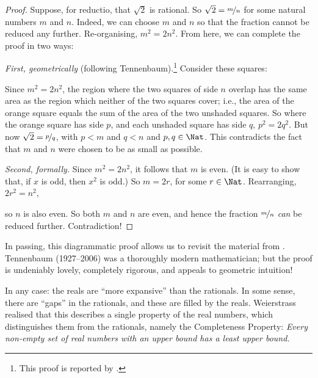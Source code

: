 \begin{proof}
Suppose, for reductio, that $\sqrt{2}$ is rational. So $\sqrt{2} =
\nicefrac{m}{n}$ for some natural numbers $m$ and $n$. Indeed, we can
choose $m$ and $n$ so that the fraction cannot be reduced any further.
Re-organising, $m^{2} = 2n^{2}$. From here, we can complete the proof
in two ways:

\emph{First, geometrically} (following Tennenbaum).\footnote{This
proof is reported by \cite{Conway2006}.} Consider these squares:
\begin{center}	
\end{center}
Since $m^2 = 2n^2$, the region where the two squares of side $n$
overlap has the same area as the region which neither of the two
squares cover; i.e., the area of the orange square equals the sum of
the area of the two unshaded squares. So where the orange square has
side $p$, and each unshaded square has side $q$, $p^2 = 2q^2$. But now
$\sqrt{2} = \nicefrac{p}{q}$, with $p < m$ and $q < n$ and $p, q \in
\Nat$. This contradicts the fact that $m$ and $n$ were chosen to be as
small as possible.
		
\emph{Second, formally.} Since $m^{2} = 2n^{2}$, it follows that $m$
is even. (It is easy to show that, if $x$ is odd, then $x^2$ is odd.)
So $m = 2r$, for some $r \in \Nat$. Rearranging, $2r^2 = n^2$, 
		
		
		
		
		
so $n$ is also even. So both $m$ and $n$ are even, and hence the
fraction $\nicefrac{m}{n}$ \emph{can} be reduced further.
Contradiction!
\end{proof}

In passing, this diagrammatic proof allows us to revisit the material from . Tennenbaum (1927--2006) was a thoroughly modern mathematician; but the proof is undeniably lovely, completely rigorous, and appeals to geometric intuition!

In any case: the reals are ``more expansive'' than the rationals. In some sense, there are ``gaps'' in the rationals, and these are filled by the reals. Weierstrass realised that this describes a single property of the real numbers, which distinguishes them from the rationals, namely the Completeness Property: \emph{Every non-empty set of real numbers with an upper bound has a least upper bound.} 

